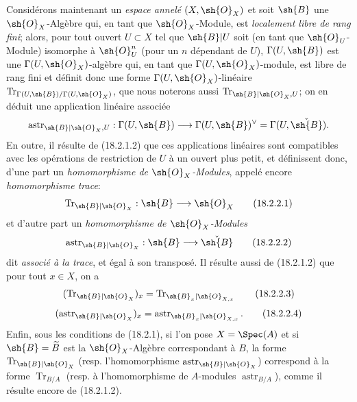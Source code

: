 \begin{env}[18.2.2]
Considérons maintenant un \emph{espace annelé} $(X,\sh{O}_X)$ et soit $\sh{B}$ une $\sh{O}_X$-Algèbre qui, en tant que $\sh{O}_X$-Module, est \emph{localement libre de rang fini}; alors, pour tout ouvert $U\subset X$ tel que $\sh{B}|U$ soit (en tant que $\sh{O}_U$-Module) isomorphe à $\sh{O}_U^n$ (pour un $n$ dépendant de $U$), $\Gamma(U,\sh{B})$ est une $\Gamma(U,\sh{O}_X)$-algèbre qui, en tant que $\Gamma(U,\sh{O}_X)$-module, est libre de rang fini et définit donc une forme $\Gamma(U,\sh{O}_X)$-linéaire $\operatorname{Tr}_{\Gamma(U,\sh{B})/\Gamma(U,\sh{O}_X)}$, que nous noterons aussi $\operatorname{Tr}_{\sh{B}|\sh{O}_X,U}$; on en déduit une application linéaire associée
\[
  \operatorname{astr}_{\sh{B}|\sh{O}_X,U}:\Gamma(U,\sh{B})\longrightarrow\Gamma(U,\sh{B})^\vee=\Gamma(U,\check{\sh{B}}).
\]
En outre, il résulte de (18.2.1.2) que ces applications linéaires sont compatibles avec les opérations de restriction de $U$ à un ouvert plus petit, et définissent donc, d'une part un \emph{homomorphisme de $\sh{O}_X$-Modules}, appelé encore \emph{homomorphisme trace}:
\begin{equation}
  \operatorname{Tr}_{\sh{B}|\sh{O}_X}:\sh{B}\longrightarrow\sh{O}_X
  \tag{18.2.2.1}\label{IV.18.2.2.1}
\end{equation}
et d'autre part un \emph{homomorphisme de $\sh{O}_X$-Modules}
\begin{equation}
  \operatorname{astr}_{\sh{B}|\sh{O}_X}:\sh{B}\longrightarrow\check{\sh{B}}
  \tag{18.2.2.2}\label{IV.18.2.2.2}
\end{equation}
dit \emph{associé à la trace}, et égal à son transposé. Il résulte aussi de (18.2.1.2) que pour tout $x\in X$, on a
\begin{equation}
  (\operatorname{Tr}_{\sh{B}|\sh{O}_X})_x=\operatorname{Tr}_{\sh{B}_x|\sh{O}_{X,x}}
  \tag{18.2.2.3}\label{IV.18.2.2.3}
\end{equation}
\begin{equation}
  (\operatorname{astr}_{\sh{B}|\sh{O}_X})_x=\operatorname{astr}_{\sh{B}_x|\sh{O}_{X,x}}.
  \tag{18.2.2.4}\label{IV.18.2.2.4}
\end{equation}
Enfin, sous les conditions de (18.2.1), si l'on pose $X=\Spec(A)$ et si $\sh{B}=\widetilde B$ est la $\sh{O}_X$-Algèbre correspondant à $B$, la forme $\operatorname{Tr}_{\sh{B}|\sh{O}_X}$ (resp. l'homomorphisme $\operatorname{astr}_{\sh{B}|\sh{O}_X}$) correspond à la forme $\operatorname{Tr}_{B/A}$ (resp. à l'homomorphisme de $A$-modules $\operatorname{astr}_{B/A}$), comme il résulte encore de (18.2.1.2).
\end{env}


